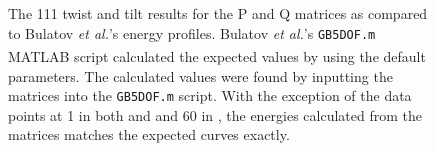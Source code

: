 \documentclass[12pt]{report}
\begin{document}
\begin{figure}[ht!]
 \centering
 
 \quad
 \caption[A comparison of the \textlangle{}111\textrangle{} copper curves with the calculated results.]{\label{appfig:compare111} The \textlangle{}111\textrangle{} twist \protect{} and tilt \protect{} results for the P and Q matrices as compared to Bulatov \emph{et al.}'s energy profiles. Bulatov \emph{et al.}'s \lstinline!GB5DOF.m! MATLAB\textsuperscript{\textregistered} script calculated the expected values by using the default parameters. The calculated values were found by inputting the matrices into the \lstinline!GB5DOF.m! script. With the exception of the data points at 1\textdegree{} in both \protect{} and \protect{} and 60\textdegree{} in \protect{}, the energies calculated from the matrices matches the expected curves exactly.}
\end{figure}
\end{document}
